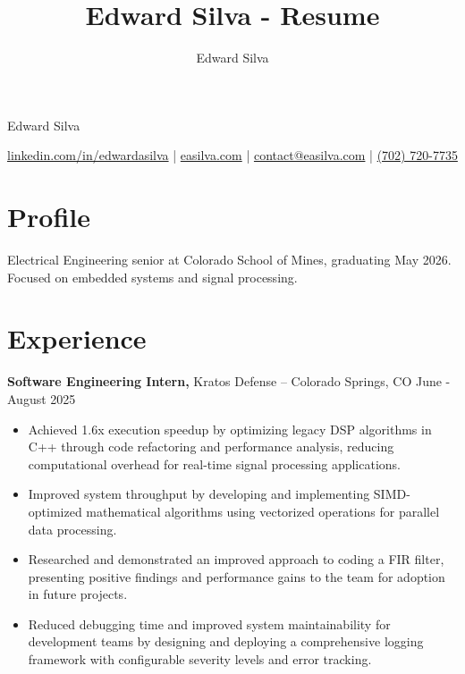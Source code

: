 \documentclass[11pt]{article}
\title{Edward Silva - Resume}
\author{Edward Silva}
\begin{document}
\thispagestyle{empty}
%
\centerline{\huge Edward Silva}%
\vspace{3pt}%
\centerline{\href{https://www.linkedin.com/in/edwardasilva}{linkedin.com/in/edwardasilva} | \href{https://easilva.com}{easilva.com} | \href{mailto:contact@easilva.com}{contact@easilva.com} | \href{tel:7027207735}{(702) 720-7735}}%
\vspace{8.0pt}%
\section*{Profile}%
%
Electrical Engineering senior at Colorado School of Mines, graduating May 2026. Focused on embedded systems and signal processing.
\section*{Experience}%
%
\textbf{Software Engineering Intern, }{Kratos Defense} -- Colorado Springs, CO \hfill June - August 2025 \\
\begin{itemize}
  \item Achieved 1.6x execution speedup by optimizing legacy DSP algorithms in C++ through code refactoring and performance analysis, reducing computational overhead for real-time signal processing applications.
  \item Improved system throughput by developing and implementing SIMD-optimized mathematical algorithms using vectorized operations for parallel data processing.
  \item Researched and demonstrated an improved approach to coding a FIR filter, presenting positive findings and performance gains to the team for adoption in future projects.
  \item Reduced debugging time and improved system maintainability for development teams by designing and deploying a comprehensive logging framework with configurable severity levels and error tracking.
\end{itemize}
\end{document}
